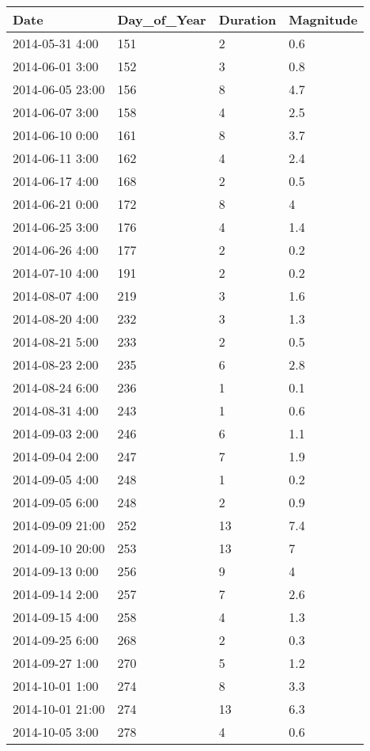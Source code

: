 \documentclass[
]{article}
\begin{document}
\begin{tabular}{l|l|l|l}
\hline
Date & Day\_of\_Year & Duration & Magnitude\\
\hline
2014-05-31 4:00 & 151 & 2 & 0.6\\
\hline
2014-06-01 3:00 & 152 & 3 & 0.8\\
\hline
2014-06-05 23:00 & 156 & 8 & 4.7\\
\hline
2014-06-07 3:00 & 158 & 4 & 2.5\\
\hline
2014-06-10 0:00 & 161 & 8 & 3.7\\
\hline
2014-06-11 3:00 & 162 & 4 & 2.4\\
\hline
2014-06-17 4:00 & 168 & 2 & 0.5\\
\hline
2014-06-21 0:00 & 172 & 8 & 4\\
\hline
2014-06-25 3:00 & 176 & 4 & 1.4\\
\hline
2014-06-26 4:00 & 177 & 2 & 0.2\\
\hline
2014-07-10 4:00 & 191 & 2 & 0.2\\
\hline
2014-08-07 4:00 & 219 & 3 & 1.6\\
\hline
2014-08-20 4:00 & 232 & 3 & 1.3\\
\hline
2014-08-21 5:00 & 233 & 2 & 0.5\\
\hline
2014-08-23 2:00 & 235 & 6 & 2.8\\
\hline
2014-08-24 6:00 & 236 & 1 & 0.1\\
\hline
2014-08-31 4:00 & 243 & 1 & 0.6\\
\hline
2014-09-03 2:00 & 246 & 6 & 1.1\\
\hline
2014-09-04 2:00 & 247 & 7 & 1.9\\
\hline
2014-09-05 4:00 & 248 & 1 & 0.2\\
\hline
2014-09-05 6:00 & 248 & 2 & 0.9\\
\hline
2014-09-09 21:00 & 252 & 13 & 7.4\\
\hline
2014-09-10 20:00 & 253 & 13 & 7\\
\hline
2014-09-13 0:00 & 256 & 9 & 4\\
\hline
2014-09-14 2:00 & 257 & 7 & 2.6\\
\hline
2014-09-15 4:00 & 258 & 4 & 1.3\\
\hline
2014-09-25 6:00 & 268 & 2 & 0.3\\
\hline
2014-09-27 1:00 & 270 & 5 & 1.2\\
\hline
2014-10-01 1:00 & 274 & 8 & 3.3\\
\hline
2014-10-01 21:00 & 274 & 13 & 6.3\\
\hline
2014-10-05 3:00 & 278 & 4 & 0.6\\

\end{tabular}
\end{document}
